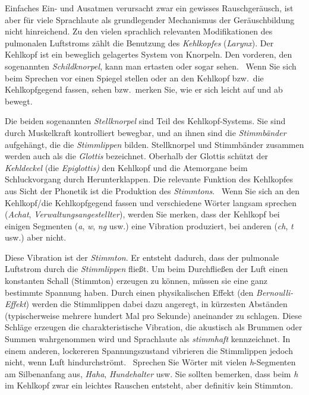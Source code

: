 \label{sec:kehlkopfrachen}

Einfaches Ein- und Ausatmen verursacht zwar ein gewisses Rauschgeräusch, ist aber für viele Sprachlaute als grundlegender Mechanismus der Geräuschbildung nicht hinreichend.
Zu den vielen sprachlich relevanten Modifikationen des pulmonalen Luftstroms zählt die Benutzung des \textit{Kehlkopfes} (\textit{Larynx}).
Der Kehlkopf ist ein beweglich gelagertes System von Knorpeln.
Den vorderen, den sogenannten \textit{Schildknorpel}, kann man ertasten oder sogar sehen.
\TuBegin~Wenn Sie sich beim Sprechen vor einen Spiegel stellen oder an den Kehlkopf bzw.\ die Kehlkopfgegend fassen, sehen bzw.\ merken Sie, wie er sich leicht auf und ab bewegt.

Die beiden sogenannten \textit{Stellknorpel} sind Teil des Kehlkopf-Systems.
Sie sind durch Muskelkraft kontrolliert bewegbar, und an ihnen sind die \textit{Stimmbänder} aufgehängt, die die \textit{Stimmlippen} bilden.
Stellknorpel und Stimmbänder zusammen werden auch als die \textit{Glottis} bezeichnet.
Oberhalb der Glottis schützt der \textit{Kehldeckel} (die \textit{Epiglottis)} den Kehlkopf und die Atemorgane beim Schluckvorgang durch Herunterklappen.
Die relevante Funktion des Kehlkopfes aus Sicht der Phonetik ist die Produktion des \textit{Stimmtons}.
\TuBegin~Wenn Sie sich an den Kehlkopf/die Kehlkopfgegend fassen und verschiedene Wörter langsam sprechen (\zB \textit{Achat}, \textit{Verwaltungsangestellter}), werden Sie merken, dass der Kehlkopf bei einigen Segmenten (\textit{a}, \textit{w}, \textit{ng} usw.) eine Vibration produziert, bei anderen (\textit{ch}, \textit{t} usw.) aber nicht.

Diese Vibration ist der \textit{Stimmton}.
Er entsteht dadurch, dass der pulmonale Luftstrom durch die \textit{Stimmlippen} fließt.
Um beim Durchfließen der Luft einen konstanten Schall (Stimmton) erzeugen zu können, müssen sie eine ganz bestimmte Spannung haben.
Durch einen physikalischen Effekt (den \textit{Bernoulli-Effekt}) werden die Stimmlippen dabei dazu angeregt, in kürzesten Abständen (typischerweise mehrere hundert Mal pro Sekunde) aneinander zu schlagen.
Diese Schläge erzeugen die charakteristische Vibration, die akustisch als Brummen oder Summen wahrgenommen wird und Sprachlaute als \textit{stimmhaft} kennzeichnet.
In einem anderen, lockereren Spannungszustand vibrieren die Stimmlippen jedoch nicht, wenn Luft hindurchströmt.
\TuBegin~Sprechen Sie Wörter mit vielen \textit{h}-Segmenten am Silbenanfang aus, \zB \textit{Haha}, \textit{Hundehalter} usw.
Sie sollten bemerken, dass beim \textit{h} im Kehlkopf zwar ein leichtes Rauschen entsteht, aber definitiv kein Stimmton.

